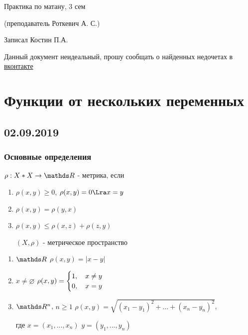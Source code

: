 \documentclass[12pt, fleqn]{article}
\begin{document}
\begin{center}
  \huge Практика по матану, 3 сем
  
  \Large (преподаватель Роткевич А. С.)
  
  \large Записал Костин П.А.
\end{center}

Данный документ неидеальный, прошу сообщать о найденных недочетах в \href{https://vk.com/drab_existence_a}{вконтакте}
\tableofcontents
\newpage

\section{Функции от нескольких переменных}
\subsection{02.09.2019}
\subsubsection{Основные определения}

\begin{definition}
    $\rho: X * X \ra \R$ - метрика, если
    \begin{enumerate}                               
    	\item $\rho(x,y) \geqslant 0$, $\rho(x,y)=0 \Lra x=y$
    	\item $\rho(x,y)=\rho(y,x)$
    	\item $\rho(x,y) \leqslant \rho(x,z)+\rho(z,y)$
    	
    	$(X,\rho)$ - метрическое пространство
	\end{enumerate} 
\end{definition}

\begin{examples}
    \begin{enumerate}  
        \item $\R$ $\rho(x,y)=|x-y|$
        \item $x \neq \varnothing$ $\rho(x,y)=
            \begin{cases}
                1, \quad x \neq y\\
                0, \quad x=y
            \end{cases}$
        \item $\R^n$, $n \geqslant 1$ $\rho(x,y)=\sqrt{(x_1-y_1)^2+...+(x_n-y_n)^2}$,
        
        где $x=(x_1,...,x_n)$ $y=(y_1,...,y_n)$
    \end{enumerate} 
\end{examples}
\end{document}
